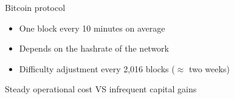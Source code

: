 \documentclass{beamer}
\begin{document}
\begin{frame}{Bitcoin protocol}
\begin{itemize}
  \item One block every 10 minutes on average
  \item Depends on the hashrate of the network
  \item Difficulty adjustment every 2,016 blocks ($\approx$ two weeks)
\end{itemize}
\begin{tcolorbox}[enhanced,drop shadow, title=Risky business]
Steady operational cost VS infrequent capital gains
\end{tcolorbox}
\end{frame}
\end{document}
